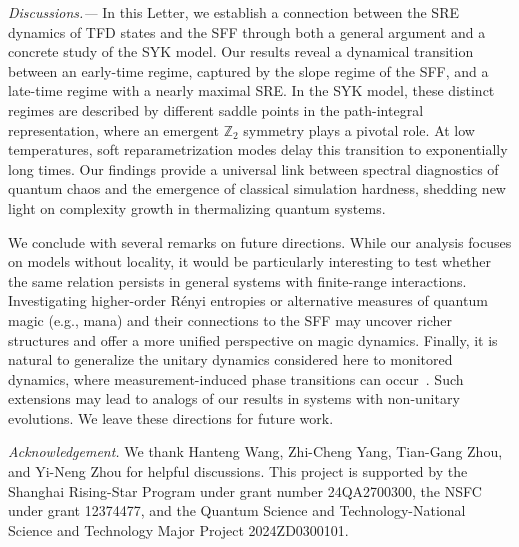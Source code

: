 \documentclass[aps,prl,twocolumn,superscriptaddress,longbibliography]{revtex4-2}
\def\supplementfilename{SI.pdf}
\def\numbersupplementpages{\the\pdflastximagepages}
\newif\ifarXiv
\begin{document}
\emph{ \color{blue}Discussions.---} In this Letter, we establish a connection between the SRE dynamics of TFD states and the SFF through both a general argument and a concrete study of the SYK model. Our results reveal a dynamical transition between an early-time regime, captured by the slope regime of the SFF, and a late-time regime with a nearly maximal SRE. In the SYK model, these distinct regimes are described by different saddle points in the path-integral representation, where an emergent $\mathbb{Z}_2$ symmetry plays a pivotal role. At low temperatures, soft reparametrization modes delay this transition to exponentially long times. Our findings provide a universal link between spectral diagnostics of quantum chaos and the emergence of classical simulation hardness, shedding new light on complexity growth in thermalizing quantum systems.

We conclude with several remarks on future directions. While our analysis focuses on models without locality, it would be particularly interesting to test whether the same relation persists in general systems with finite-range interactions. Investigating higher-order R\'enyi entropies or alternative measures of quantum magic (e.g., mana) and their connections to the SFF may uncover richer structures and offer a more unified perspective on magic dynamics. Finally, it is natural to generalize the unitary dynamics considered here to monitored dynamics, where measurement-induced phase transitions can occur~\cite{PhysRevX.9.031009,PhysRevB.98.205136,PhysRevB.99.224307}. Such extensions may lead to analogs of our results in systems with non-unitary evolutions. We leave these directions for future work.




\vspace{5pt}
\textit{Acknowledgement.}
We thank Hanteng Wang, Zhi-Cheng Yang, Tian-Gang Zhou, and Yi-Neng Zhou for helpful discussions. This project is supported by the Shanghai Rising-Star Program under grant number 24QA2700300, the NSFC under grant 12374477, and the Quantum Science and Technology-National Science and Technology Major Project 2024ZD0300101.







\ifarXiv
\foreach \x in {1,...,\numbersupplementpages}
{
  \clearpage
  
}
\fi
\end{document}
